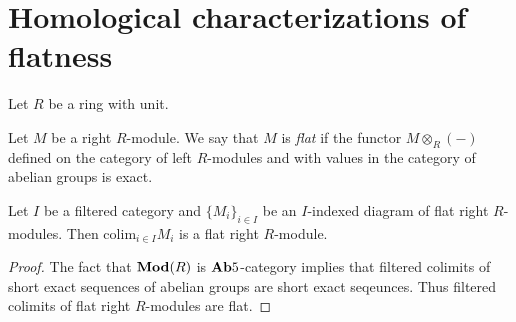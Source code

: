 \section{Homological characterizations of flatness}
\noindent
Let $R$ be a ring with unit.

\begin{definition}
Let $M$ be a right $R$-module. We say that $M$ is \textit{flat} if the functor $M\otimes_R(-)$ defined on the category of left $R$-modules and with values in the category of abelian groups is exact.
\end{definition}

\begin{proposition}\label{proposition:flatcolimits}
Let $I$ be a filtered category and $\{M_i\}_{i\in I}$ be an $I$-indexed diagram of flat right $R$-modules. Then $\mathrm{colim}_{i\in I}M_i$ is a flat right $R$-module.
\end{proposition}
\begin{proof}
The fact that $\mathbf{Mod}(R)$ is $\mathbf{Ab}5$-category implies that filtered colimits of short exact sequences of abelian groups are short exact seqeunces. Thus filtered colimits of flat right $R$-modules are flat.
\end{proof}

